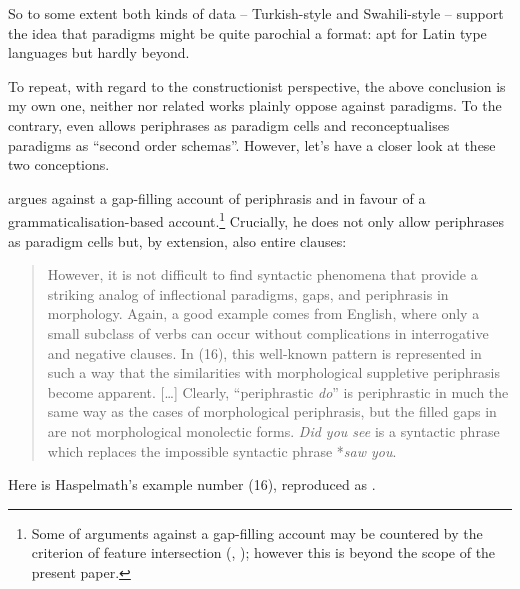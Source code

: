 \documentclass[output=paper]{langsci/langscibook}
\begin{document}
So to some extent both kinds of data – Turkish-style and Swahili-style – support the idea that paradigms might be quite parochial a format: apt for Latin type languages but hardly beyond.

To repeat, with regard to the constructionist perspective, the above conclusion is my own one, neither \citet[58--59]{Haspelmath2011} nor related works plainly oppose against paradigms. To the contrary, \citet{Haspelmath2000} even allows periphrases as paradigm cells and \citet{Booij2016} reconceptualises paradigms as “second order schemas”. However, let’s have a closer look at these two conceptions.\largerpage[2]

\citet{Haspelmath2000} argues against a gap-filling account of periphrasis and in favour of a grammaticalisation-based account.\footnote{Some of  arguments against a gap-filling account may be countered by the criterion of feature intersection (\citealt[250--252]{BrownBrown2012}, \citealt{Reiner2020}); however this is beyond the scope of the present paper.} Crucially, he does not only allow periphrases as paradigm cells but, by extension, also entire clauses:

\begin{quote}
However, it is not difficult to find syntactic phenomena that provide a striking analog of inflectional paradigms, gaps, and periphrasis in morphology. Again, a good example comes from English, where only a small subclass of verbs can occur without complications in interrogative and negative clauses. In (16), this well-known pattern is represented in such a way that the similarities with morphological suppletive periphrasis become apparent. […] Clearly, “periphrastic \textit{do}” is periphrastic in much the same way as the cases of morphological periphrasis, but the filled gaps in  are not morphological monolectic forms. \textit{Did you see} is a syntactic phrase which replaces the impossible syntactic phrase *\textit{saw you}. \citep[662]{Haspelmath2000}
\end{quote}

Here is Haspelmath’s example number (16), reproduced as .

\end{document}
